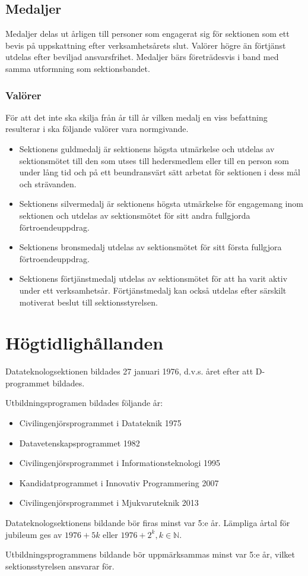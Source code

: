 \documentclass{datateknologsektionen-document}
\begin{document}
\subsection{Medaljer}
Medaljer delas ut årligen till personer som engagerat sig för sektionen som ett
bevis på uppskattning efter verksamhetsårets slut. Valörer högre än förtjänst
utdelas efter beviljad ansvarsfrihet. Medaljer bärs företrädesvis i band med samma
utformning som sektionsbandet.

\subsubsection{Valörer}
För att det inte ska skilja från år till år vilken medalj en viss befattning resulterar
i ska följande valörer vara normgivande.

\begin{itemize}
  \item Sektionens guldmedalj är sektionens högsta utmärkelse och utdelas av sektionsmötet
        till den som utses till hedersmedlem eller till en person som under lång tid och på
        ett beundransvärt sätt arbetat för sektionen i dess mål och strävanden.

  \item Sektionens silvermedalj är sektionens högsta utmärkelse för engagemang inom sektionen
        och utdelas av sektionsmötet för sitt andra fullgjorda förtroendeuppdrag.

  \item Sektionens bronsmedalj utdelas av sektionsmötet för sitt första fullgjora förtroendeuppdrag.

  \item Sektionens förtjänstmedalj utdelas av sektionsmötet för att ha varit aktiv under ett verksamhetsår.
        Förtjänstmedalj kan också utdelas efter särskilt motiverat beslut till sektionsstyrelsen.
\end{itemize}

\section{Högtidlighållanden}
\label{hogtidshallande}
Datateknologsektionen bildades 27 januari 1976, d.v.s. året efter att D-programmet bildades.

Utbildningsprogramen bildades följande år:
\begin{itemize}
  \item Civilingenjörsprogrammet i Datateknik 1975
  \item Datavetenskapsprogrammet 1982
  \item Civilingenjörsprogrammet i Informationsteknologi 1995
  \item Kandidatprogrammet i Innovativ Programmering 2007
  \item Civilingenjörsprogrammet i Mjukvaruteknik 2013
\end{itemize}

Datateknologsektionens bildande bör firas minst var 5:e år. Lämpliga årtal för jubileum
ges av \(1976 + 5k\) eller \(1976 + 2^k, k \in \mathbb{N}\).

Utbildningsprogrammens bildande bör uppmärksammas minst var 5:e år, vilket sektionsstyrelsen ansvarar för.
\end{document}
